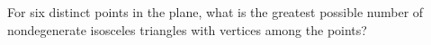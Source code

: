 For six distinct points in the plane, what is the greatest possible number of nondegenerate isosceles triangles with vertices among the points?
